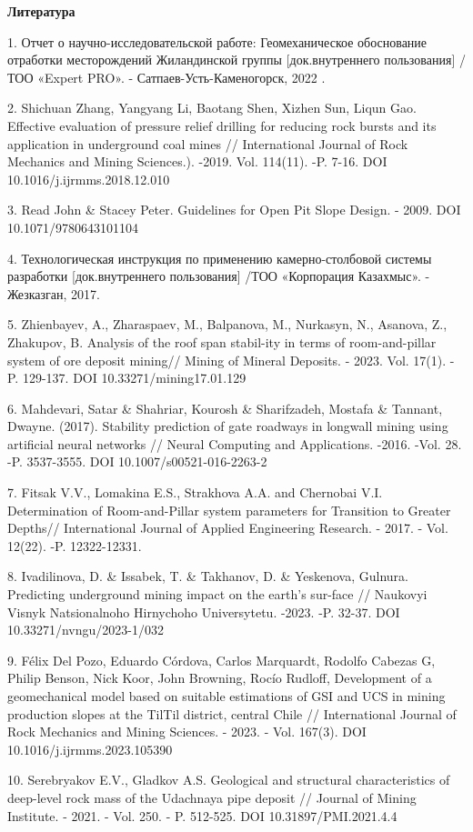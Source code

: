 \begin{center}
{\bfseries Литература}
\end{center}

\begin{noparindent}
1. Отчет о научно-исследовательской работе: Геомеханическое обоснование
отработки месторождений Жиландинской группы {[}док.внутреннего
пользования{]} / ТОО «Expert PRO». - Сатпаев-Усть-Каменогорск, 2022 .

2. Shichuan Zhang, Yangyang Li, Baotang Shen, Xizhen Sun, Liqun Gao.
Effective evaluation of pressure relief drilling for reducing rock
bursts and its application in underground coal mines // International
Journal of Rock Mechanics and Mining Sciences.). -2019. Vol. 114(11).
-P. 7-16. DOI 10.1016/j.ijrmms.2018.12.010

3. Read John \& Stacey Peter. Guidelines for Open Pit Slope Design. -
2009. DOI 10.1071/9780643101104

4. Технологическая инструкция по применению камерно-столбовой системы
разработки {[}док.внутреннего пользования{]} /ТОО «Корпорация Казахмыс».
- Жезказган, 2017.

5. Zhienbayev, A., Zharaspaev, M., Balpanova, M., Nurkasyn, N., Asanova,
Z., Zhakupov, B. Analysis of the roof span stabil-ity in terms of
room-and-pillar system of ore deposit mining// Mining of Mineral
Deposits. - 2023. Vol. 17(1). - P. 129-137. DOI
10.33271/mining17.01.129

6. Mahdevari, Satar \& Shahriar, Kourosh \& Sharifzadeh, Mostafa \&
Tannant, Dwayne. (2017). Stability prediction of gate roadways in
longwall mining using artificial neural networks // Neural Computing and
Applications. -2016. -Vol. 28. -P. 3537-3555. DOI
10.1007/s00521-016-2263-2

7. Fitsak V.V., Lomakina E.S., Strakhova A.A. and Chernobai V.I.
Determination of Room-and-Pillar system parameters for Transition to
Greater Depths// International Journal of Applied Engineering Research.
- 2017. - Vol. 12(22). -P. 12322-12331.

8. Ivadilinova, D. \& Issabek, T. \& Takhanov, D. \& Yeskenova, Gulnura.
Predicting underground mining impact on the earth's sur-face // Naukovyi
Visnyk Natsionalnoho Hirnychoho Universytetu. -2023. -P. 32-37. DOI
10.33271/nvngu/2023-1/032

9. Félix Del Pozo, Eduardo Córdova, Carlos Marquardt, Rodolfo Cabezas G,
Philip Benson, Nick Koor, John Browning, Rocío Rudloff, Development of a
geomechanical model based on suitable estimations of GSI and UCS in
mining production slopes at the TilTil district, central Chile //
International Journal of Rock Mechanics and Mining Sciences. - 2023. -
Vol. 167(3). DOI 10.1016/j.ijrmms.2023.105390

10. Serebryakov E.V., Gladkov A.S. Geological and structural
characteristics of deep-level rock mass of the Udachnaya pipe deposit //
Journal of Mining Institute. - 2021. - Vol. 250. - P. 512-525. DOI
10.31897/PMI.2021.4.4
\end{noparindent}

